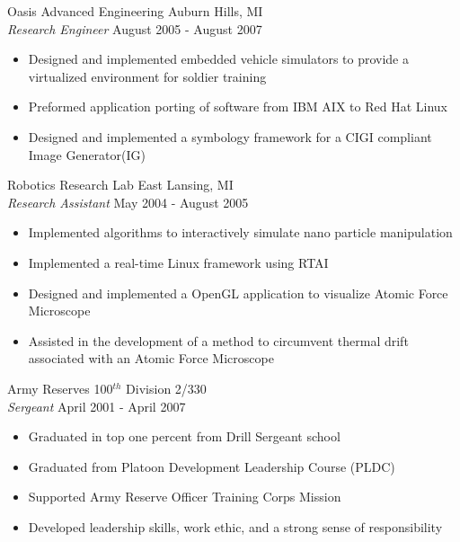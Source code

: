 \documentclass[line]{res}
\begin{document}
\begin{resume}
    \vspace{-2mm}
    Oasis Advanced Engineering \hfill Auburn Hills, MI\\
    {\sl Research Engineer} \hfill August 2005 - August 2007
    \vspace{1mm}
    \begin{itemize} 
      \item Designed and implemented embedded vehicle simulators to 
      provide a virtualized environment for soldier training  
      \item Preformed application porting of software from IBM AIX to Red Hat
      Linux
      \item Designed and implemented a symbology framework for a CIGI compliant
      Image Generator(IG)
    \end{itemize}

    \vspace{-2mm}
    Robotics Research Lab \hfill East Lansing, MI\\
    {\sl Research Assistant} \hfill May 2004 - August 2005
    \vspace{1mm}
    \begin{itemize} 
      \item Implemented algorithms to interactively simulate nano
        particle manipulation
      \item Implemented a real-time Linux framework using RTAI
      \item Designed and implemented a OpenGL application to visualize Atomic Force Microscope 
      \item Assisted in the development of a method to circumvent thermal drift
      associated with an Atomic Force Microscope
    \end{itemize}

    \vspace{-2mm}
    Army Reserves \hfill 100$^{th}$ Division 2/330\\
    {\sl Sergeant} \hfill April 2001 - April 2007
    \vspace{1mm}
    \begin{itemize} 
      \item Graduated in top one percent from Drill Sergeant school
      \item Graduated from Platoon Development Leadership Course (PLDC)
      \item Supported Army Reserve Officer Training Corps Mission
      \item Developed leadership skills, work ethic, and a strong sense of
      responsibility      
    \end{itemize}


\end{resume}
\end{document}
